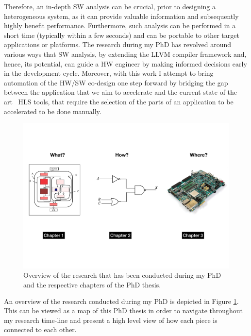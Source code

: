 \documentclass[]{usiinfthesis}
\newcommand{\SoTA}{{state-of-the-art}}
\begin{document}
Therefore, an in-depth SW analysis can be crucial, prior to 
designing a heterogeneous system, as it can provide valuable information and subsequently 
highly benefit performance. Furthermore, such analysis can be performed in a short time (typically within a 
few seconds) and can be portable to other target applications or platforms. 
The research during my PhD has revolved around various ways that SW
analysis, by extending the LLVM compiler framework \cite{LattnerMar04} and, hence, its potential,
can guide a HW engineer %
by making informed decisions early in the development cycle. 
Moreover, with this work I attempt to bring automation of the 
HW/SW co-design one step forward by bridging the gap between the application that we aim to accelerate and the  
current
\SoTA\ 
HLS tools, that require the selection of the parts of an application to be accelerated to be done manually.
\par

\begin{figure}[t]
\centering
\includegraphics[width= 1 \linewidth]{figs/Research_Carol}
\caption{Overview of the research that has been conducted during my PhD and the respective chapters
of the PhD thesis.}
\label{fig:overview}
\end{figure}

An overview of the research conducted during my PhD is depicted in Figure \ref{fig:overview}.
This can be viewed as a map of this PhD thesis in order to navigate throughout my 
research time-line and present a high level view of how each piece is connected to each other.\par
\end{document}
